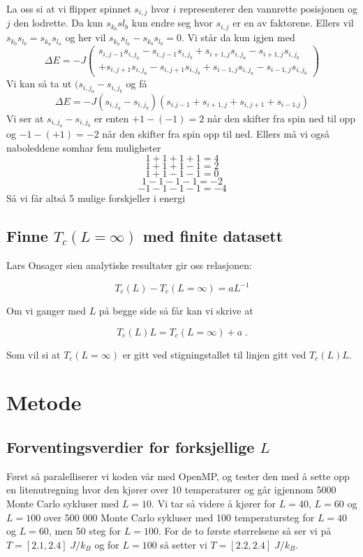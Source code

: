 \documentclass[reprint,english,notitlepage]{revtex4-2}  %
\begin{document}
La oss si at vi flipper spinnet $s_{i,j}$ hvor $i$ representerer den vannrette posisjonen og $j$ den lodrette. Da kun $s_{k_b}s{l_b}$ kun endre seg hvor $s_{i,j}$ er en av faktorene. Ellers vil $s_{k_b}s_{l_b}=s_{k_a}s_{l_a}$ og her vil $s_{k_a}s_{l_a}-s_{k_b}s_{l_b}=0$. Vi står da kun igjen med
$$
\Delta E= -J \begin{pmatrix} s_{i,j-1}s_{i,j_a}-s_{i,j-1}s_{i,j_b}+s_{i+1,j}s_{i,j_a}-s_{i+1,j}s_{i,j_b} \\+ s_{i,j+1}s_{i,j_a}-s_{i,j+1}s_{i,j_b}+s_{i-1,j}s_{i,j_a}-s_{i-1,j}s_{i,j_b}\end{pmatrix}
$$
Vi kan så ta ut $(s_{i,j_a}-s_{i,j_b}$ og få
$$
\Delta E=-J(s_{i,j_a}-s_{i,j_b})(
s_{i.j-1}+s_{i+1,j} +s_{i,j+1}+s_{i-1.j}
)
$$
Vi ser at $s_{i,j_a}-s_{i,j_b}$ er enten $+1-(-1)=2$ når den skifter fra spin ned til opp og $-1-(+1)=-2$ når den skifter fra spin opp til ned. Ellers må vi også naboleddene somhar fem muligheter
$$
1+1+1+1=4
$$
$$
1+1+1-1=2
$$
$$
1+1-1-1=0
$$
$$
1-1-1-1=-2
$$
$$
-1-1-1-1=-4
$$
Så vi får altså 5 mulige forskjeller i energi

\subsection*{Finne $T_c \left ( L = \infty \right ) $ med finite datasett}

Lars Onsager sien analytiske resultater gir oss relasjonen:

$$ T_c \left ( L \right ) - T_c \left ( L = \infty \right ) = aL^{-1}$$

Om vi ganger med $L$ på begge side så får kan vi skrive at

\begin{equation}\label{Tinf}
T_c \left (L \right ) L = T_c \left ( L = \infty \right ) + a \; .
\end{equation}

Som vil si at $T_c \left ( L = \infty \right ) $ er gitt ved stigningstallet til linjen gitt ved $T_c \left ( L \right ) L $.  

\section{Metode}

\subsection*{Forventingsverdier for forksjellige $L$}

Først så paralelliserer vi koden vår med OpenMP, og tester den med å sette opp en litenutregning hvor den kjører over 10 temperaturer og går igjennom 5000 Monte Carlo sykluser med $L = 10$. Vi tar så videre å kjører for $L = 40$, $L = 60$ og $L = 100$ over 500 000 Monte Carlo sykluser med 100 temperatursteg for $L = 40$ og $L = 60$, men 50 steg for $L = 100$. For de to første størrelsene så ser vi på $T = [2.1, 2.4] \; J/k_B$ og for $L = 100$ så setter vi $T = [2.2, 2.4] \; J/k_B$.
\end{document}
